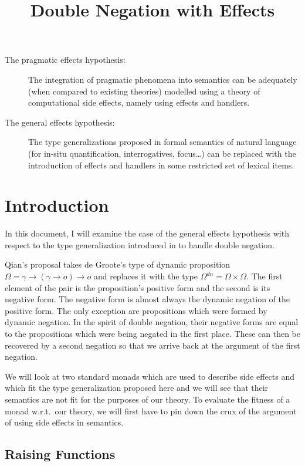 \documentclass[a4paper,11pt,DIV=12]{scrartcl}
\title{Double Negation with Effects}
\date{}
\begin{document}
\maketitle

\begin{description}
  \item[The pragmatic effects hypothesis:] The integration of pragmatic
    phenomena into semantics can be adequately (when compared to existing
    theories) modelled using a theory of computational side effects, namely
    using effects and handlers.

  \item[The general effects hypothesis:] The type generalizations proposed
    in formal semantics of natural language (for in-situ quantification,
    interrogatives, focus\ldots) can be replaced with the introduction of
    effects and handlers in some restricted set of lexical items.
\end{description}

\section{Introduction}

In this document, I will examine the case of the general effects hypothesis
with respect to the type generalization introduced in
\cite{saiaccessibilite} to handle double negation.

Qian's proposal takes de Groote's type of dynamic proposition $\Omega =
\gamma \to (\gamma \to o) \to o$ and replaces it with the type $\Omega^{dn}
= \Omega \times \Omega$. The first element of the pair is the proposition's
positive form and the second is its negative form. The negative form is
almost always the dynamic negation of the positive form. The only exception
are propositions which were formed by dynamic negation. In the spirit of
double negation, their negative forms are equal to the propositions which
were being negated in the first place. These can then be recovered by a
second negation so that we arrive back at the argument of the first
negation.

We will look at two standard monads which are used to describe side effects
and which fit the type generalization proposed here and we will see that
their semantics are not fit for the purposes of our theory. To evaluate the
fitness of a monad w.r.t.\ our theory, we will first have to pin down the
crux of the argument of using side effects in semantics.

\subsection{Raising Functions}
\label{ssec:raise}
\end{document}
